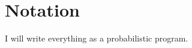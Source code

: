 
\inbpdocument

\chapter*{Notation}
\label{ch:notation}

I will write everything as a probabilistic program.

\outbpdocument{
}


